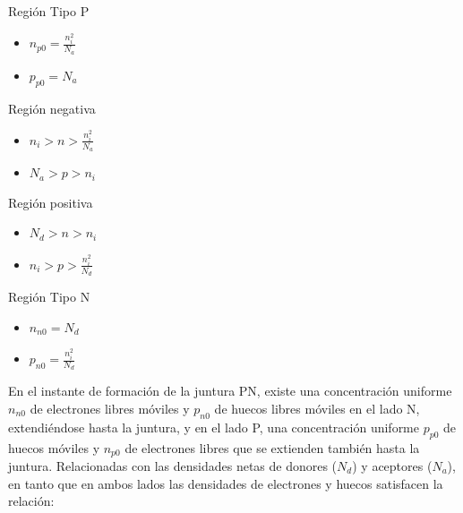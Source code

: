 \documentclass[oneside]{book}
\numberwithin{equation}{section}
\numberwithin{figure}{section}
\numberwithin{table}{section}
\begin{document}
			\begin{minipage}[t]{0.2\textwidth}
				\begin{center}
					Región Tipo P
					\begin{itemize}
						\item $n_{p0}=\frac{n_i^2}{N_a}$
						\item $p_{p0}=N_a$
					\end{itemize}
				\end{center}
			\end{minipage}
			\begin{minipage}[t]{0.2\textwidth}
				\begin{center}
					Región negativa
					\begin{itemize}
						\item $n_i>n>\frac{n_i^2}{N_a}$
						\item $N_a>p>n_i$
					\end{itemize}
				\end{center}
			\end{minipage}
			\begin{minipage}[t]{0.2\textwidth}
				\begin{center}
					Región positiva
					\begin{itemize}
						\item $N_d>n>n_i$
						\item $n_i>p>\frac{n_i^2}{N_d}$
					\end{itemize}
				\end{center}
			\end{minipage}
			\begin{minipage}[t]{0.2\textwidth}
				\begin{center}
					Región Tipo N
					\begin{itemize}
						\item $n_{n0}=N_d$
						\item $p_{n0}=\frac{n_i^2}{N_d}$
					\end{itemize}
				\end{center}
			\end{minipage}					
		\vfill
		En el instante de formación de la juntura PN, existe una concentración uniforme $n_{n0}$ de electrones libres móviles y $p_{n0}$ de huecos libres móviles en el lado N, extendiéndose hasta la juntura, y en el lado P, una concentración uniforme $p_{p0}$ de huecos móviles y $n_{p0}$ de electrones libres que se extienden también hasta la juntura. Relacionadas con las densidades netas de donores ($N_d$) y aceptores ($N_a$), en tanto que en ambos lados las densidades de electrones y huecos satisfacen la relación:
		
\end{document}
